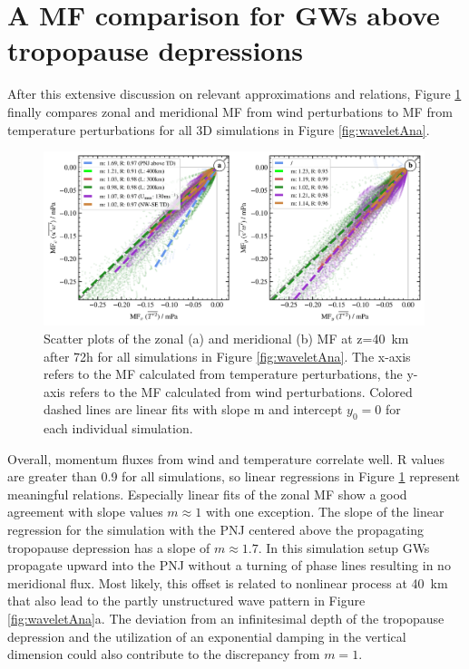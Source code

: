 \section{A MF comparison for GWs above tropopause depressions}
After this extensive discussion on relevant approximations and relations, Figure \ref{fig:mf_scatter} finally compares zonal and meridional MF from wind perturbations to MF from temperature perturbations for all 3D simulations in Figure \ref{fig:waveletAna}.
\begin{figure}[t]
    \centering
    \includegraphics[width=0.99\textwidth]{figures_3D/waveletAna_mf_scatter.png}
    \caption{Scatter plots of the zonal (a) and meridional (b) MF at z=\SI{40}{\kilo\meter} after 72h for all simulations in Figure \ref{fig:waveletAna}. The x-axis refers to the MF calculated from temperature perturbations, the y-axis refers to the MF calculated from wind perturbations. Colored dashed lines are linear fits with slope m and intercept $y_{0}=0$ for each individual simulation.}
    \label{fig:mf_scatter}
\end{figure}
Overall, momentum fluxes from wind and temperature correlate well. R values are greater than 0.9 for all simulations, so linear regressions in Figure \ref{fig:mf_scatter} represent meaningful relations. Especially linear fits of the zonal MF show a good agreement with slope values $m \approx 1$ with one exception. The slope of the linear regression for the simulation with the PNJ centered above the propagating tropopause depression has a slope of $m \approx 1.7$. In this simulation setup GWs propagate upward into the PNJ without a turning of phase lines resulting in no meridional flux. Most likely, this offset is related to nonlinear process at \SI{40}{\kilo\meter} that also lead to the partly unstructured wave pattern in Figure \ref{fig:waveletAna}a. The deviation from an infinitesimal depth of the tropopause depression and the utilization of an exponential damping in the vertical dimension could also contribute to the discrepancy from $m = 1$.

